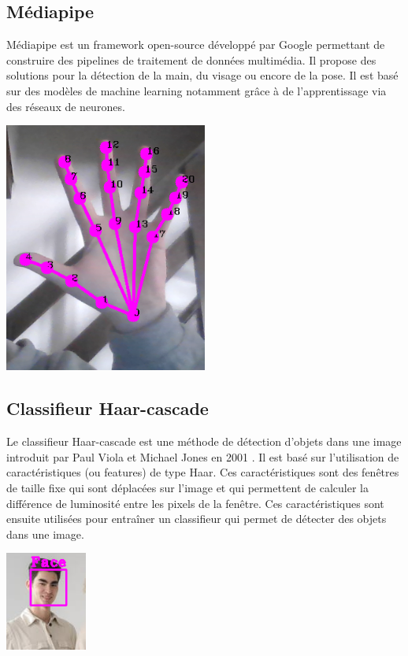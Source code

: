 \documentclass[11pt]{article}
\begin{document}
\subsection{Médiapipe}
Médiapipe est un framework open-source développé par Google permettant de construire des pipelines de traitement de données multimédia. Il propose des solutions pour la détection de la main, du visage ou encore de la pose. Il est basé sur des modèles de machine learning notamment grâce à de l'apprentissage via des réseaux de neurones. \bigbreak

\begin{center}
    \includegraphics[width=0.5\textwidth]{images/mediapipe_ex.png}
\end{center}


\subsection{Classifieur Haar-cascade}
Le classifieur Haar-cascade est une méthode de détection d'objets dans une image introduit par Paul Viola et Michael Jones en 2001 \cite{viola_rapid_2001}. Il est basé sur l'utilisation de caractéristiques (ou features) de type Haar. Ces caractéristiques sont des fenêtres de taille fixe qui sont déplacées sur l'image et qui permettent de calculer la différence de luminosité entre les pixels de la fenêtre. Ces caractéristiques sont ensuite utilisées pour entraîner un classifieur qui permet de détecter des objets dans une image. \bigbreak

\begin{center}
    \includegraphics[width=0.2\textwidth]{images/visage.png}
    \label{fig:visage}
\end{center}
\end{document}
